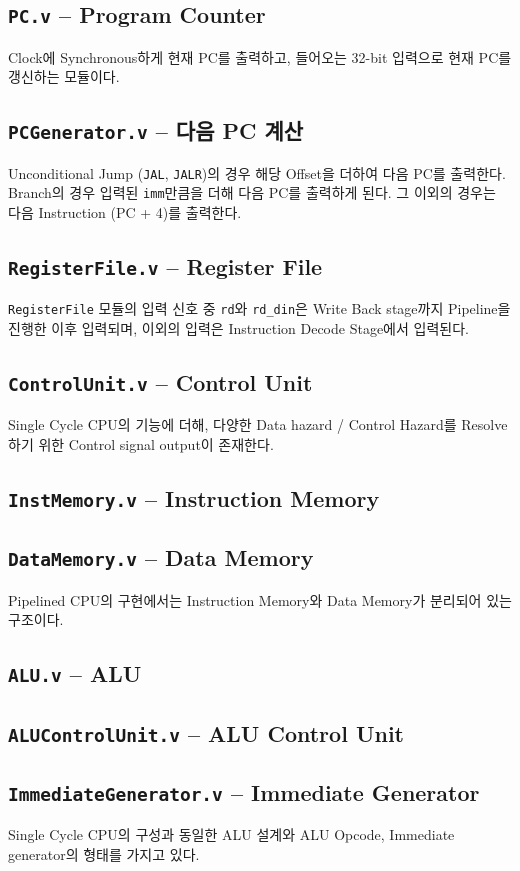 \documentclass{scrartcl}
\begin{document}
\subsection{\texttt{PC.v} -- Program Counter}
Clock에 Synchronous하게 현재 PC를 출력하고, 들어오는 32-bit 입력으로 현재 PC를 갱신하는 모듈이다.

\subsection{\texttt{PCGenerator.v} -- 다음 PC 계산}
Unconditional Jump (\texttt{JAL}, \texttt{JALR})의 경우 해당 Offset을 더하여 다음 PC를 출력한다.
Branch의 경우 입력된 \texttt{imm}만큼을 더해 다음 PC를 출력하게 된다.
그 이외의 경우는 다음 Instruction (PC + 4)를 출력한다.

\subsection{\texttt{RegisterFile.v} -- Register File}
\texttt{RegisterFile} 모듈의 입력 신호 중 \texttt{rd}와 \texttt{rd\_din}은 Write Back stage까지 Pipeline을 진행한 이후 입력되며, 이외의 입력은 Instruction Decode Stage에서 입력된다.

\subsection{\texttt{ControlUnit.v} -- Control Unit}
Single Cycle CPU의 기능에 더해, 다양한 Data hazard / Control Hazard를 Resolve하기 위한 Control signal output이 존재한다.

\subsection{\texttt{InstMemory.v} -- Instruction Memory}
\subsection{\texttt{DataMemory.v} -- Data Memory}
Pipelined CPU의 구현에서는 Instruction Memory와 Data Memory가 분리되어 있는 구조이다.

\subsection{\texttt{ALU.v} -- ALU}
\subsection{\texttt{ALUControlUnit.v} -- ALU Control Unit}
\subsection{\texttt{ImmediateGenerator.v} -- Immediate Generator}
Single Cycle CPU의 구성과 동일한 ALU 설계와 ALU Opcode, Immediate generator의 형태를 가지고 있다.
\end{document}

